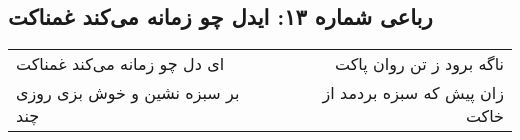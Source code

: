\begin{center}
\section*{رباعی شماره ۱۳: ایدل چو زمانه می‌کند غمناکت}
\label{sec:sh013}
\begin{longtable}{l p{0.5cm} r}
ای دل چو زمانه می‌کند غمناکت
&&
ناگه برود ز تن روان پاکت
\\
بر سبزه نشین و خوش بزی روزی چند
&&
زان پیش که سبزه بردمد از خاکت
\\
\end{longtable}
\end{center}
